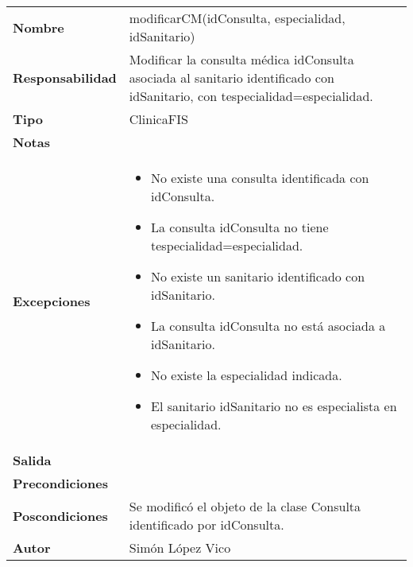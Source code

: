 \documentclass[11pt,a4paper]{article}
\begin{document}
\begin{table}[H]
	\centering
	\label{my-label}
	\begin{tabularx}{\textwidth}{l|X}
		\textbf{Nombre}          & modificarCM(idConsulta, especialidad, idSanitario) \\
		\textbf{Responsabilidad} & Modificar la consulta médica idConsulta asociada al sanitario identificado con idSanitario, con tespecialidad=especialidad. \\
		\textbf{Tipo}            & ClinicaFIS \\
		\textbf{Notas}           &  \\
		\textbf{Excepciones}     &
		\begin{itemize}
			\item No existe una consulta identificada con idConsulta.
			\item La consulta idConsulta no tiene tespecialidad=especialidad.
			\item No existe un sanitario identificado con idSanitario. 
			\item La consulta idConsulta no está asociada a idSanitario.
			\item No existe la especialidad indicada.
			\item El sanitario idSanitario no es especialista en especialidad.
		\end{itemize} \\
		\textbf{Salida}          &  \\
		\textbf{Precondiciones}  &  \\
		\textbf{Poscondiciones}  & Se modificó el objeto de la clase Consulta identificado por idConsulta. \\
		\textbf{Autor}			 & Simón López Vico
	\end{tabularx}
\end{table}
\end{document}
